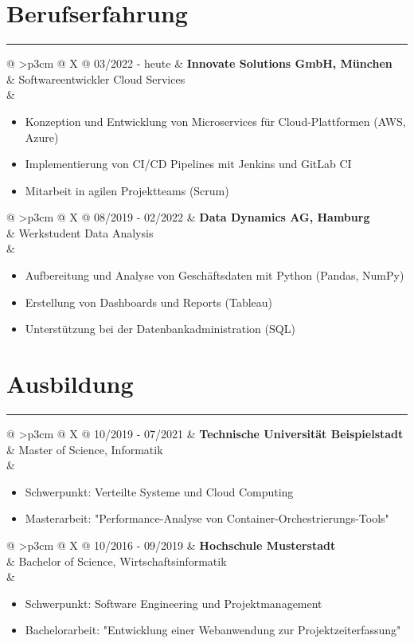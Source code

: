 \documentclass[11pt, a4paper]{scrartcl} %
\makeatletter
\newcommand{\rulesection}[1]{%
    \section*{#1}%
    \vspace{0.5ex}%
    {\noindent\rule{\linewidth}{0.4pt}}%
    \vspace{2ex}%
}
\newcommand{\cvsectionentry}[4]{%
  \par\noindent
  \begin{tabularx}{\linewidth}{@{} >{\Centering\small}p{3cm} @{\hspace{2em}} X @{}} %
    #1 & \textbf{#2} \\ %
       & #3 \\          %
       & \vspace{0.5ex}%
         \begin{minipage}[t]{\linewidth}
           \begin{itemize}#4\end{itemize} %
         \end{minipage}
  \end{tabularx}%
  \vspace{1.5ex}%
}
\makeatother
\begin{document}
\rulesection{Berufserfahrung}

\cvsectionentry{03/2022 - heute} %
               {Innovate Solutions GmbH, München} %
               {Softwareentwickler Cloud Services} %
               {%
                 \item Konzeption und Entwicklung von Microservices für Cloud-Plattformen (AWS, Azure)
                 \item Implementierung von CI/CD Pipelines mit Jenkins und GitLab CI
                 \item Mitarbeit in agilen Projektteams (Scrum)
               }

\cvsectionentry{08/2019 - 02/2022} %
               {Data Dynamics AG, Hamburg} %
               {Werkstudent Data Analysis} %
               {%
                 \item Aufbereitung und Analyse von Geschäftsdaten mit Python (Pandas, NumPy)
                 \item Erstellung von Dashboards und Reports (Tableau)
                 \item Unterstützung bei der Datenbankadministration (SQL)
               }

\rulesection{Ausbildung}

\cvsectionentry{10/2019 - 07/2021} %
               {Technische Universität Beispielstadt} %
               {Master of Science, Informatik} %
               {%
                 \item Schwerpunkt: Verteilte Systeme und Cloud Computing
                 \item Masterarbeit: "Performance-Analyse von Container-Orchestrierungs-Tools"
               }

\cvsectionentry{10/2016 - 09/2019} %
               {Hochschule Musterstadt} %
               {Bachelor of Science, Wirtschaftsinformatik} %
               {%
                 \item Schwerpunkt: Software Engineering und Projektmanagement
                 \item Bachelorarbeit: "Entwicklung einer Webanwendung zur Projektzeiterfassung"
               }
\end{document}
